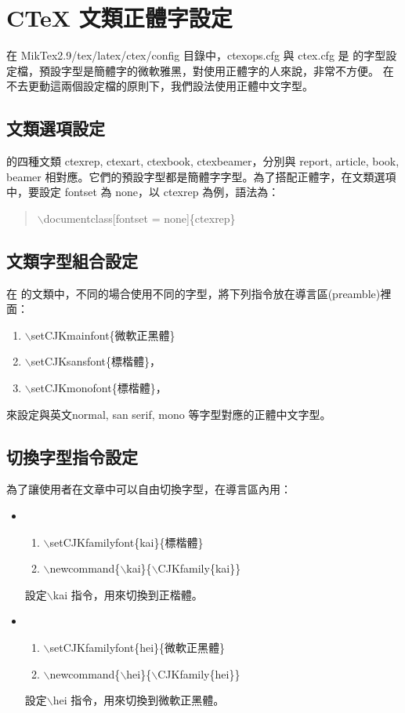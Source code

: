 \chapter{CTeX 文類正體字設定}
在 MikTex2.9/tex/latex/ctex/config 目錄中，ctexops.cfg 與 ctex.cfg 是 \CTeX 的字型設定檔，預設字型是簡體字的微軟雅黑，對使用正體字的人來說，非常不方便。
在不去更動這兩個設定檔的原則下，我們設法使用正體中文字型。
\section{文類選項設定}
\CTeX 的四種文類 ctexrep, ctexart, ctexbook, ctexbeamer，分別與 report, article, book, beamer 相對應。它們的預設字型都是簡體字字型。為了搭配正體字，在文類選項中，要設定 fontset 為 none，以 ctexrep 為例，語法為：
\begin{quote}
$\backslash$documentclass[fontset = none]\{ctexrep\} 
\end{quote}
\section{文類字型組合設定}
在 \CTeX 的文類中，不同的場合使用不同的字型，將下列指令放在導言區(preamble)裡面：
\begin{enumerate}
\item $\backslash$setCJKmainfont\{微軟正黑體\} 
\item $\backslash$setCJKsansfont\{標楷體\}，
\item $\backslash$setCJKmonofont\{標楷體\}，
\end{enumerate}
來設定與英文normal, san serif, mono 等字型對應的正體中文字型。

\section{切換字型指令設定}
為了讓使用者在文章中可以自由切換字型，在導言區內用：
\begin{itemize}
\item
\begin{enumerate}
\item $\backslash$setCJKfamilyfont\{kai\}\{標楷體\}
\item $\backslash$newcommand\{$\backslash$kai\}\{$\backslash$CJKfamily\{kai\}\}
\end{enumerate}
設定$\backslash$kai 指令，用來切換到正楷體。
\item 
\begin{enumerate}
\item $\backslash$setCJKfamilyfont\{hei\}\{微軟正黑體\}
\item $\backslash$newcommand\{$\backslash$hei\}\{$\backslash$CJKfamily\{hei\}\}
\end{enumerate}
設定$\backslash$hei 指令，用來切換到微軟正黑體。
\end{itemize}
